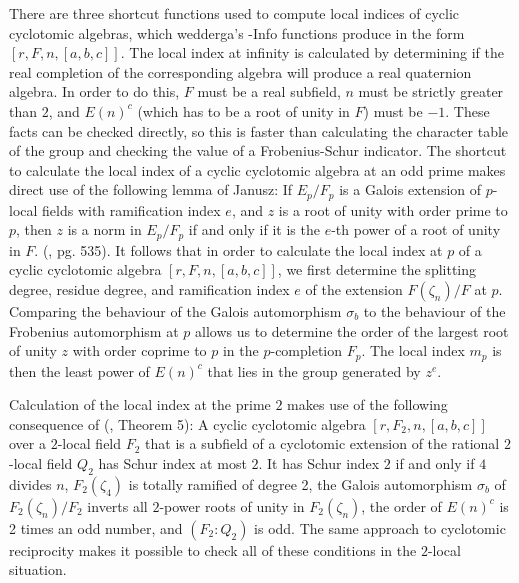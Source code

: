 \documentclass[a4paper,11pt]{report}
\begin{document}
{{ There are three shortcut functions used to compute local indices of cyclic
cyclotomic algebras, which wedderga's -Info functions produce in the form $[r,F,n,[a,b,c]]$. The local index at infinity is calculated by determining if the real
completion of the corresponding algebra will produce a real quaternion
algebra. In order to do this, $F$ must be a real subfield, $n$ must be strictly greater than $2$, and $E(n)^c$ (which has to be a root of unity in $F$) must be $-1$. These facts can be checked directly, so this is faster than calculating the
character table of the group and checking the value of a Frobenius-Schur
indicator. The shortcut to calculate the local index of a cyclic cyclotomic
algebra at an odd prime makes direct use of the following lemma of Janusz: If $E_p/F_p$ is a Galois extension of $p$-local fields with ramification index $e$, and $z$ is a root of unity with order prime to $p$, then $z$ is a norm in $E_p/F_p$ if and only if it is the $e$-th power of a root of unity in $F$. (\cite{J}, pg. 535). It follows that in order to calculate the local index at $p$ of a cyclic cyclotomic algebra $[r,F,n,[a,b,c]]$, we first determine the splitting degree, residue degree, and ramification
index $e$ of the extension $F(\zeta_n)/F$ at $p$. Comparing the behaviour of the Galois automorphism $\sigma_b$ to the behaviour of the Frobenius automorphism at $p$ allows us to determine the order of the largest root of unity $z$ with order coprime to $p$ in the $p$-completion $F_p$. The local index $m_p$ is then the least power of $E(n)^c$ that lies in the group generated by $z^e$. 

 Calculation of the local index at the prime $2$ makes use of the following consequence of (\cite{J}, Theorem 5): A cyclic cyclotomic algebra $[r,F_2,n,[a,b,c]]$ over a $2$-local field $F_2$ that is a subfield of a cyclotomic extension of the rational $2$-local field $Q_2$ has Schur index at most $2$. It has Schur index $2$ if and only if $4$ divides $n$, $F_2(\zeta_4)$ is totally ramified of degree 2, the Galois automorphism $\sigma_b$ of $F_2(\zeta_n)/F_2$ inverts all $2$-power roots of unity in $F_2(\zeta_n)$, the order of $E(n)^c$ is 2 times an odd number, and $(F_2:Q_2)$ is odd. The same approach to cyclotomic reciprocity makes it possible to check
all of these conditions in the $2$-local situation. 

}}
\end{document}
